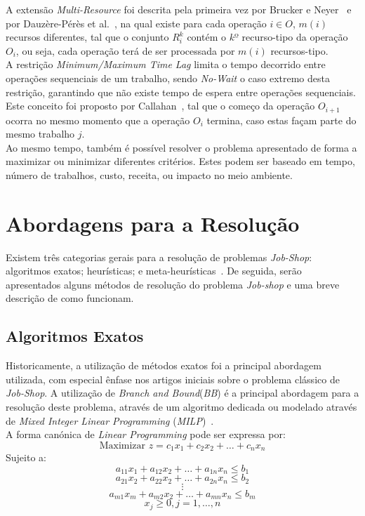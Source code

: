 A extensão \textit{Multi-Resource} foi descrita pela primeira vez por Brucker e Neyer~\cite{bruckerTabusearchMultimodeJobshop1998} e por Dauzère-Pérès et al.~\cite{dauzere-peresMultiresourceShopScheduling1998}, na qual existe para cada operação $i \in O$, $m(i)$ recursos diferentes, tal que o conjunto $R_{i}^{k}$ contém o $kº$ recurso-tipo da operação $O_{i}$, ou seja, cada operação terá de ser processada por $m(i)$ recursos-tipo.\\

A restrição \textit{Minimum/Maximum Time Lag} limita o tempo decorrido entre operações sequenciais de um trabalho, sendo \textit{No-Wait} o caso extremo desta restrição, garantindo que não existe tempo de espera entre operações sequenciais. Este conceito foi proposto por Callahan~\cite{callahanNothingHotDelay1971}, tal que o começo da operação $O_{i+1}$ ocorra no mesmo momento que a operação $O_{i}$ termina, caso estas façam parte do mesmo trabalho $j$.\\

Ao mesmo tempo, também é possível resolver o problema apresentado de forma a maximizar ou minimizar diferentes critérios. Estes podem ser baseado em tempo, número de trabalhos, custo, receita, ou impacto no meio ambiente.\\

\section{Abordagens para a Resolução}
\label{sec:abordagens_para_a_resolução}

Existem três categorias gerais para a resolução de problemas \textit{Job-Shop}: algoritmos exatos; heurísticas; e meta-heurísticas~\cite{jiangReviewIntelligentScheduling2023}. De seguida, serão apresentados alguns métodos de resolução do problema \textit{Job-shop} e uma breve descrição de como funcionam.

\subsection{Algoritmos Exatos}

Historicamente, a utilização de métodos exatos foi a principal abordagem utilizada, com especial ênfase nos artigos iniciais sobre o problema clássico de \textit{Job-Shop}. A utilização de \textit{Branch and Bound}(\textit{BB}) é a principal abordagem para a resolução deste problema, através de um algoritmo dedicada ou modelado através de \textit{Mixed Integer Linear Programming} (\textit{MILP})~\cite{dauzere-peresFlexibleJobShop2024}.\\
A forma canónica de \textit{Linear Programming} pode ser expressa por:\\
$$\text{Maximizar } z =c_{1}x_{1} + c_{2}x_{2} + \ldots + c_{n}x_{n}$$
Sujeito a:
$$a_{11}x_{1} + a_{12}x_{2} + \ldots + a_{1n}x_{n} \leq b_{1}$$
$$a_{21}x_{2} + a_{22}x_{2} + \ldots + a_{2n}x_{n} \leq b_{2}$$
$$\vdots$$
$$a_{m1}x_{m} + a_{m2}x_{2} + \ldots + a_{mn}x_{n} \leq b_{m}$$
$$x_{j} \geq 0, j=1, \ldots, n$$

